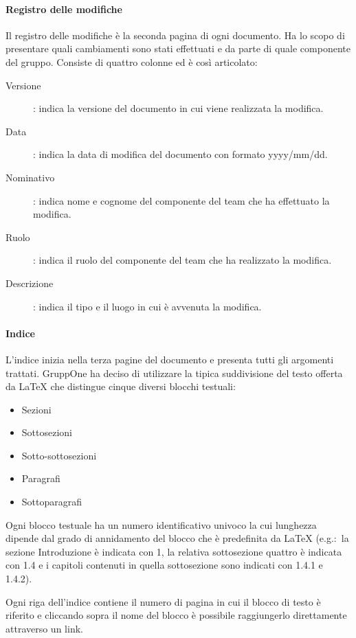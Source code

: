 \documentclass[../norme-di-progetto.tex]{subfiles}
\begin{document}
\paragraph{Registro delle modifiche}%
\label{par:registro_delle_modifiche}
Il registro delle modifiche è la seconda pagina di ogni documento. Ha lo scopo di presentare quali cambiamenti sono stati effettuati e da parte di quale componente del gruppo. Consiste di quattro colonne ed è così articolato:
\begin{description}
  \item [Versione]: indica la versione del documento in cui viene realizzata la modifica.
  \item [Data]: indica la data di modifica del documento con formato yyyy/mm/dd.
  \item [Nominativo]: indica nome e cognome del componente del team che ha effettuato la modifica.
  \item [Ruolo]: indica il ruolo del componente del team che ha realizzato la modifica.
  \item [Descrizione]: indica il tipo e il luogo in cui è avvenuta la modifica.
\end{description}

\paragraph{Indice}%
\label{par:indice}
L'indice inizia nella terza pagine del documento e presenta tutti gli argomenti trattati.
GruppOne ha deciso di utilizzare la tipica suddivisione del testo offerta da \LaTeX{} che distingue cinque diversi blocchi testuali:
\begin{itemize}
  \item Sezioni
  \item Sottosezioni
  \item Sotto-sottosezioni
  \item Paragrafi
  \item Sottoparagrafi
\end{itemize}

Ogni blocco testuale ha un numero identificativo univoco la cui lunghezza dipende dal grado di annidamento del blocco che è predefinita da \LaTeX{} (e.g.:\ la sezione Introduzione è indicata con 1, la relativa sottosezione quattro è indicata con 1.4 e i capitoli contenuti in quella sottosezione sono indicati con 1.4.1 e 1.4.2).

Ogni riga dell'indice contiene il numero di pagina in cui il blocco di testo è riferito e cliccando sopra il nome del blocco è possibile raggiungerlo direttamente attraverso un link.
\end{document}
